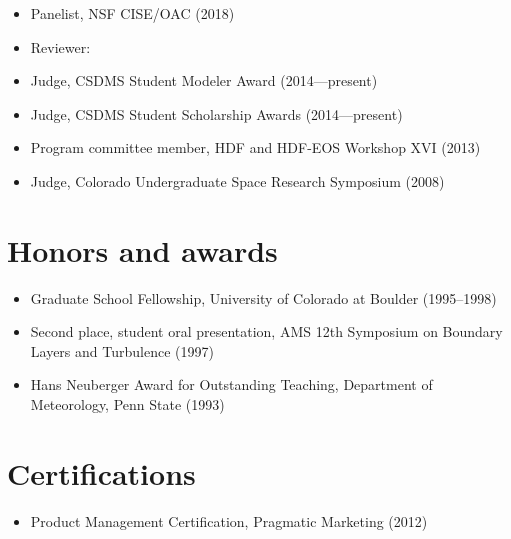 \documentclass[letterpaper]{resume}
\begin{document}
\begin{itemize}

  \item Panelist, NSF CISE/OAC (2018)

  \item Reviewer:

  \item Judge, CSDMS Student Modeler Award (2014---present)

  \item Judge, CSDMS Student Scholarship Awards (2014---present)

  \item Program committee member, HDF and HDF-EOS Workshop XVI (2013)

  \item Judge, Colorado Undergraduate Space Research Symposium (2008)

\end{itemize}


\section{Honors and awards}
\vspace{0.5em}

\begin{itemize}

  \item Graduate School Fellowship, University of Colorado at Boulder
    (1995--1998)

  \item Second place, student oral presentation, AMS 12th Symposium on
    Boundary Layers and Turbulence (1997)

  \item Hans Neuberger Award for Outstanding Teaching, Department of
    Meteorology, Penn State (1993)

\end{itemize}


\section{Certifications}
\vspace{0.5em}

\begin{itemize}
  \item Product Management Certification, Pragmatic Marketing (2012)
\end{itemize}

\end{document}
